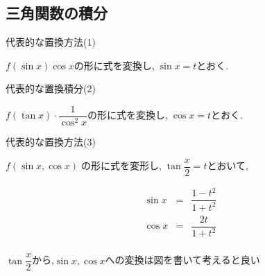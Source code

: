 \documentclass[a4paper]{jsarticle}
\begin{document}
\subsection{三角関数の積分}
\begin{itembox}[l]{代表的な置換方法(1)}
    \begin{center}
        $f\left(\sin x\right)\cos x$の形に式を変換し,$\; \sin x= t$とおく.
    \end{center}
\end{itembox}
\begin{itembox}[l]{代表的な置換積分(2)}
    \begin{center}
        $f\left(\tan x\right)\cdot \dfrac{1}{\cos^2 x}$の形に式を変換し,$\; \cos x= t$とおく.
    \end{center}
\end{itembox}
\begin{itembox}[l]{代表的な置換方法(3)}
    \begin{center}
        $f\left(\sin x,\cos x\right)\;$の形に式を変形し,$\; \tan\dfrac{x}{2}=t$とおいて,
    \end{center}
    \begin{eqnarray*}
        \sin x&=&\dfrac{1-t^2}{1+t^2}\\
        \cos x&=&\dfrac{2t}{1+t^2}\\
    \end{eqnarray*}
    \begin{center}
        $\tan\dfrac{x}{2}$から,$\sin x,\cos x$への変換は図を書いて考えると良い
    \end{center}
\end{itembox}
\end{document}
